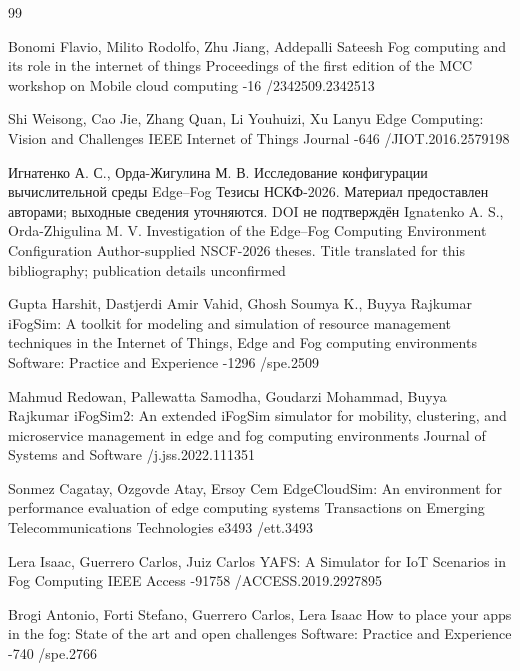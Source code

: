 \begin{thebibliography}{99}

\by Bonomi Flavio, Milito Rodolfo, Zhu Jiang, Addepalli Sateesh
\paper Fog computing and its role in the internet of things
\jour Proceedings of the first edition of the MCC workshop on Mobile cloud computing
-16
/2342509.2342513

\by Shi Weisong, Cao Jie, Zhang Quan, Li Youhuizi, Xu Lanyu
\paper Edge Computing: Vision and Challenges
\jour IEEE Internet of Things Journal
-646
/JIOT.2016.2579198

\by Игнатенко А. С., Орда-Жигулина М. В.
\paper Исследование конфигурации вычислительной среды Edge--Fog
\inbook Тезисы НСКФ-2026. Материал предоставлен авторами; выходные сведения уточняются. DOI не подтверждён
\transl
\by Ignatenko A. S., Orda-Zhigulina M. V.
\paper Investigation of the Edge--Fog Computing Environment Configuration
\inbook Author-supplied NSCF-2026 theses. Title translated for this bibliography; publication details unconfirmed

\by Gupta Harshit, Dastjerdi Amir Vahid, Ghosh Soumya K., Buyya Rajkumar
\paper iFogSim: A toolkit for modeling and simulation of resource management techniques in the Internet of Things, Edge and Fog computing environments
\jour Software: Practice and Experience
-1296
/spe.2509

\by Mahmud Redowan, Pallewatta Samodha, Goudarzi Mohammad, Buyya Rajkumar
\paper iFogSim2: An extended iFogSim simulator for mobility, clustering, and microservice management in edge and fog computing environments
\jour Journal of Systems and Software
/j.jss.2022.111351

\by Sonmez Cagatay, Ozgovde Atay, Ersoy Cem
\paper EdgeCloudSim: An environment for performance evaluation of edge computing systems
\jour Transactions on Emerging Telecommunications Technologies
\pages e3493
/ett.3493

\by Lera Isaac, Guerrero Carlos, Juiz Carlos
\paper YAFS: A Simulator for IoT Scenarios in Fog Computing
\jour IEEE Access
-91758
/ACCESS.2019.2927895

\by Brogi Antonio, Forti Stefano, Guerrero Carlos, Lera Isaac
\paper How to place your apps in the fog: State of the art and open challenges
\jour Software: Practice and Experience
-740
/spe.2766


\end{thebibliography}
